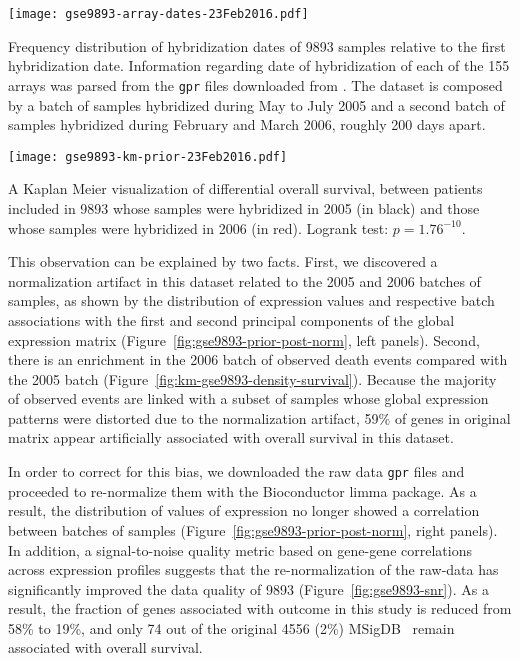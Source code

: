 \begin{marginfigure}%
  \begin{center}
    \texttt{[image: gse9893-array-dates-23Feb2016.pdf]}
    \caption[Time distribution of hybridization dates of the samples in
    9893]{Frequency distribution of hybridization dates of
      9893 samples relative to the first hybridization date.
      Information regarding date of hybridization of each of the 155 arrays was
      parsed from the \texttt{gpr} files downloaded from .  The
      dataset is composed by a batch of samples hybridized during May to July
      2005 and a second batch of samples hybridized during February and March
      2006, roughly 200 days apart.}
    \label{fig:array-dates}
  \end{center}
\end{marginfigure}

\begin{marginfigure}%
  \begin{center}
    \texttt{[image: gse9893-km-prior-23Feb2016.pdf]}
    \caption[Kaplan Meyer of dataset 9893 discretized by time
    batches]{A Kaplan Meier visualization of differential overall survival,
      between patients included in 9893 whose samples were
      hybridized in 2005 (in black) and those whose samples were hybridized in
      2006 (in red). Logrank test: $p = 1.76^{-10}$.}
    \label{fig:km-gse9893-prior}
  \end{center}
\end{marginfigure}

This observation can be explained by two facts.  First, we discovered a
normalization artifact in this dataset related to the 2005 and 2006 batches
of samples, as shown by the distribution of expression values and respective
batch associations with the first and second principal components of the global
expression matrix (Figure~\ref{fig:gse9893-prior-post-norm}, left panels).
Second, there is an enrichment in the 2006 batch of observed death events
compared with the 2005 batch (Figure~\ref{fig:km-gse9893-density-survival}).
Because the majority of observed events are linked with a subset of samples
whose global expression patterns were distorted due to the normalization
artifact, 59\% of genes in original matrix appear artificially associated with
overall survival in this dataset.

In order to correct for this bias, we downloaded the raw data \texttt{gpr} files
and proceeded to re-normalize them with the \textsf{Bioconductor limma} package.
As a result, the distribution of values of expression no longer showed a
correlation between batches of samples
(Figure~\ref{fig:gse9893-prior-post-norm}, right panels).  In addition, a
signal-to-noise quality metric based on gene-gene correlations across expression
profiles\cite{venet_measure_2012} suggests that the re-normalization of the
raw-data has significantly improved the data quality of 9893
(Figure~\ref{fig:gse9893-snr}).  As a result, the fraction of genes associated
with outcome in this study is reduced from 58\% to 19\%, and only 74 out of the
original 4556 (2\%) \mbox{MSigDB } remain associated with overall
survival.

